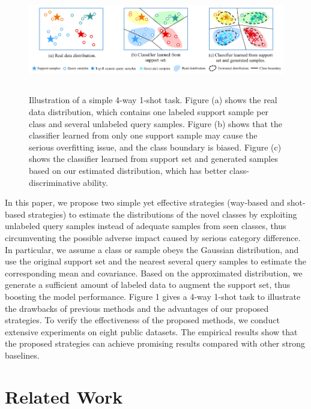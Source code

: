 \documentclass[letterpaper]{article} %
\begin{document}
\begin{figure}
	\centering
	\includegraphics[height=4.6cm]{figure/framework.pdf}
	\caption{Illustration of a simple 4-way 1-shot task. Figure (a) shows the real data distribution, which contains one labeled support sample per class and several unlabeled query samples. Figure (b) shows that the classifier learned from only one support sample may cause the serious overfitting issue, and the class boundary is biased. Figure (c) shows the classifier learned from support set and generated samples based on our estimated distribution, which has better class-discriminative ability.}
	\label{framework}
\end{figure}

In this paper, we propose two simple yet effective strategies (way-based and shot-based strategies) to estimate the distributions of the novel classes by exploiting unlabeled query samples instead of adequate samples from seen classes, thus circumventing the possible adverse impact caused by serious category difference. In particular, we assume a class or sample obeys the Gaussian distribution, and use the original support set and the nearest several query samples to estimate the corresponding mean and covariance. Based on the approximated distribution, we generate a sufficient amount of labeled data to augment the support set, thus boosting the model performance. Figure 1 gives a 4-way 1-shot task to illustrate the drawbacks of previous methods and the advantages of our proposed strategies. To verify the effectiveness of the proposed methods, we conduct extensive experiments on eight public datasets. The empirical results show that the proposed strategies can achieve promising results compared with other strong baselines.

\section{Related Work}
\end{document}
